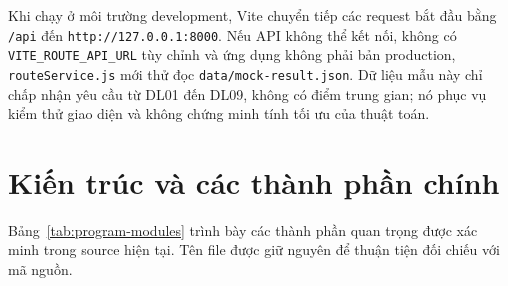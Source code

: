 Khi chạy ở môi trường development, Vite chuyển tiếp các request bắt đầu bằng
\texttt{/api} đến \texttt{http://127.0.0.1:8000}. Nếu API không thể kết nối,
không có \texttt{VITE\_ROUTE\_API\_URL} tùy chỉnh và ứng dụng không phải bản
production, \texttt{routeService.js} mới thử đọc \texttt{data/mock-result.json}.
Dữ liệu mẫu này chỉ chấp nhận yêu cầu từ DL01 đến DL09, không có điểm trung gian;
nó phục vụ kiểm thử giao diện và không chứng minh tính tối ưu của thuật toán.

\section{Kiến trúc và các thành phần chính}

Bảng~\ref{tab:program-modules} trình bày các thành phần quan trọng được xác
minh trong source hiện tại. Tên file được giữ nguyên để thuận tiện đối chiếu
với mã nguồn.

